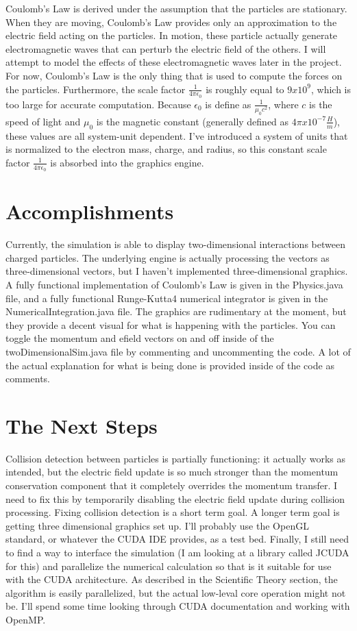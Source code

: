 \documentclass[10pt]{article}
\begin{document}
Coulomb's Law is derived under the assumption that the particles are stationary. When they are moving, Coulomb's Law provides only an approximation to the electric field acting on the particles. In motion, these particle actually generate electromagnetic waves that can perturb the electric field of the others. I will attempt to model the effects of these electromagnetic waves later in the project. For now, Coulomb's Law is the only thing that is used to compute the forces on the particles. Furthermore, the scale factor $\frac{1}{4\pi\epsilon_0}$ is roughly equal to $9 x 10^9$, which is too large for accurate computation. Because $\epsilon_0$ is define as $\frac{1}{\mu_0 c^2}$, where $c$ is the speed of light and $\mu_0$ is the magnetic constant (generally defined as $4\pi x 10^{-7} \frac{H}{m}$), these values are all system-unit dependent. I've introduced a system of units that is normalized to the electron mass, charge, and radius, so this constant scale factor $\frac{1}{4\pi\epsilon_0}$ is absorbed into the graphics engine.

\section{Accomplishments}
Currently, the simulation is able to display two-dimensional interactions between charged particles. The underlying engine is actually processing the vectors as three-dimensional vectors, but I haven't implemented three-dimensional graphics. A fully functional implementation of Coulomb's Law is given in the Physics.java file, and a fully functional Runge-Kutta4 numerical integrator is given in the NumericalIntegration.java file. The graphics are rudimentary at the moment, but they provide a decent visual for what is happening with the particles. You can toggle the momentum and efield vectors on and off inside of the twoDimensionalSim.java file by commenting and uncommenting the code. A lot of the actual explanation for what is being done is provided inside of the code as comments. 

\section{The Next Steps}
Collision detection between particles is partially functioning: it actually works as intended, but the electric field update is so much stronger than the momentum conservation component that it completely overrides the momentum transfer. I need to fix this by temporarily disabling the electric field update during collision processing. Fixing collision detection is a short term goal. A longer term goal is getting three dimensional graphics set up. I'll probably use the OpenGL standard, or whatever the CUDA IDE provides, as a test bed. Finally, I still need to find a way to interface the simulation (I am looking at a library called JCUDA for this) and parallelize the numerical calculation so that is it suitable for use with the CUDA architecture. As described in the Scientific Theory section, the algorithm is easily parallelized, but the actual low-leval core operation might not be. I'll spend some time looking through CUDA documentation and working with OpenMP. 
\end{document}
